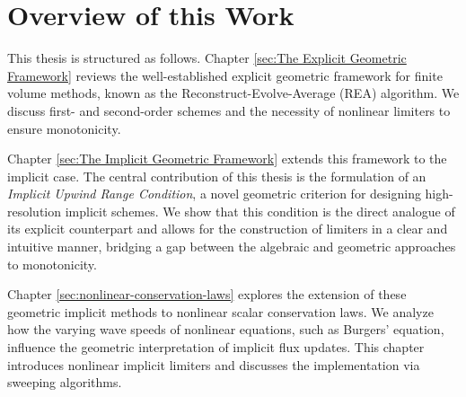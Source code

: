 \section{Overview of this Work}
\label{sec:overview}

This thesis is structured as follows.
Chapter \ref{sec:The Explicit Geometric Framework} reviews the well-established explicit geometric framework for finite volume methods, known as the Reconstruct-Evolve-Average (REA) algorithm. We discuss first- and second-order schemes and the necessity of nonlinear limiters to ensure monotonicity.

Chapter \ref{sec:The Implicit Geometric Framework} extends this framework to the implicit case.
The central contribution of this thesis is the formulation of an \textit{Implicit Upwind Range Condition}, a novel geometric criterion for designing high-resolution implicit schemes.
We show that this condition is the direct analogue of its explicit counterpart and allows for the construction of limiters in a clear and intuitive manner, bridging a gap between the algebraic and geometric approaches to monotonicity.

Chapter \ref{sec:nonlinear-conservation-laws} explores the extension of these geometric implicit methods to nonlinear scalar conservation laws.
We analyze how the varying wave speeds of nonlinear equations, such as Burgers' equation, influence the geometric interpretation of implicit flux updates.
This chapter introduces nonlinear implicit limiters and discusses the implementation via sweeping algorithms.
